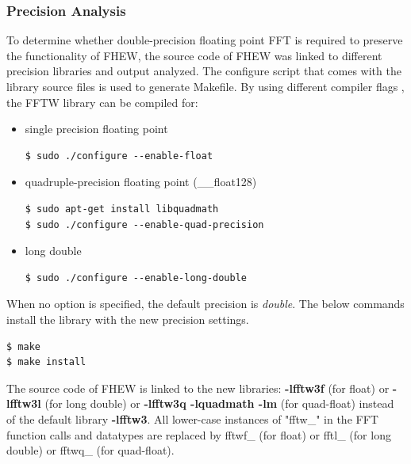 \subsubsection*{Precision Analysis}
To determine whether double-precision floating point FFT is required to preserve the functionality of FHEW, the source code of FHEW was linked to different precision libraries and output analyzed. The configure script that comes with the library source files is used to generate Makefile. By using different compiler flags \cite{fftw_unix}, the FFTW library can be compiled for:
\begin{itemize}
\item single precision floating point
\begin{scriptsize}
\linuxbash
\begin{lstlisting}
$ sudo ./configure --enable-float
\end{lstlisting}
\end{scriptsize}
\item quadruple-precision floating point (\_\_float128)
\begin{scriptsize}
\linuxbash
\begin{lstlisting}
$ sudo apt-get install libquadmath
$ sudo ./configure --enable-quad-precision
\end{lstlisting}
\end{scriptsize}
\item long double 
\begin{scriptsize}
\linuxbash
\begin{lstlisting}
$ sudo ./configure --enable-long-double
\end{lstlisting}
\end{scriptsize}
\end{itemize}
When no option is specified, the default precision is \textit{double}. The below commands install the library with the new precision settings.
\begin{scriptsize}
\linuxbash
\begin{lstlisting}
$ make
$ make install
\end{lstlisting}
\end{scriptsize}
The source code of FHEW is linked to the new libraries: \textbf{-lfftw3f} (for float) or \textbf{-lfftw3l} (for long double) or \textbf{-lfftw3q -lquadmath -lm} (for quad-float) instead of the default library \textbf{-lfftw3}.\newline\newline
All lower-case instances of "fftw\_" in the FFT function calls and datatypes are replaced by fftwf\_ (for float) or fftl\_ (for long double) or fftwq\_ (for quad-float).\\
